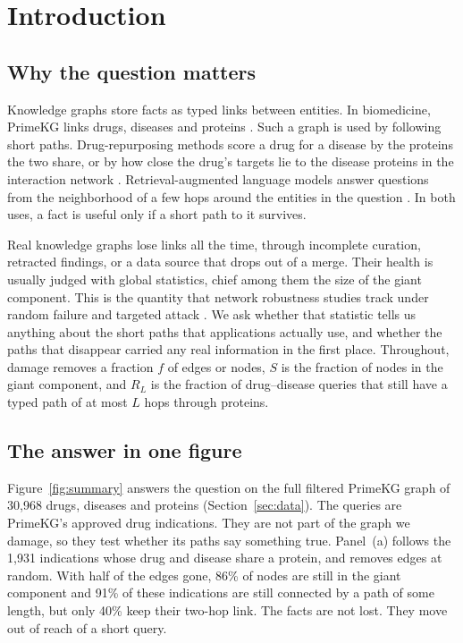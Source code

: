 \section{Introduction}
\label{sec:introduction}

\subsection{Why the question matters}

Knowledge graphs store facts as typed links between entities. In biomedicine,
PrimeKG links drugs, diseases and proteins \cite{chandak2023primekg}. Such a
graph is used by following short paths. Drug-repurposing methods score a drug
for a disease by the proteins the two share, or by how close the drug's targets
lie to the disease proteins in the interaction network
\cite{guney2016network}. Retrieval-augmented language models answer questions
from the neighborhood of a few hops around the entities in the question
\cite{edge2024graphrag}. In both uses, a fact is useful only if a short path to
it survives.

Real knowledge graphs lose links all the time, through incomplete curation,
retracted findings, or a data source that drops out of a merge. Their health is
usually judged with global statistics, chief among them the size of the giant
component. This is the quantity that network robustness studies track under
random failure and targeted attack \cite{albert2000error,callaway2000network}.
We ask whether that statistic tells us anything about the short paths that
applications actually use, and whether the paths that disappear carried any
real information in the first place. Throughout, damage removes a fraction $f$
of edges or nodes, $S$ is the fraction of nodes in the giant component, and
$R_L$ is the fraction of drug--disease queries that still have a typed path of
at most $L$ hops through proteins.

\subsection{The answer in one figure}

Figure~\ref{fig:summary} answers the question on the full filtered PrimeKG
graph of 30,968 drugs, diseases and proteins (Section~\ref{sec:data}). The
queries are PrimeKG's approved drug indications. They are not part of the graph
we damage, so they test whether its paths say something true. Panel~(a) follows
the 1,931 indications whose drug and disease share a protein, and removes edges
at random. With half of the edges gone, 86\% of nodes are still in the giant
component and 91\% of these indications are still connected by a path of some
length, but only 40\% keep their two-hop link. The facts are not lost. They move
out of reach of a short query.

